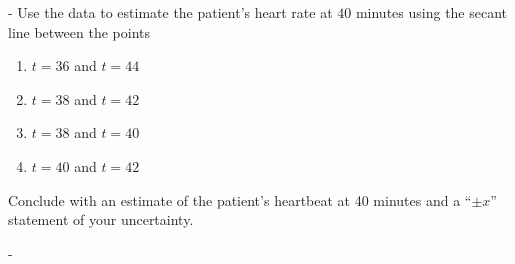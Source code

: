 \documentclass[12pt]{article}
\makeatletter
\newcounter{probcount}
\newcounter{subprobcount}
\newlength\probsep
\newlength\pshrinking
\newif\iffirstprob
\newenvironment{aproblems}%
  {\ifhmode\unskip\par\fi\setcounter{probcount}{0}\probsep\parskip
  \sbox\@tempboxa{\textbf{9.}}\pshrinking\wd\@tempboxa\advance\pshrinking\labelsep
  \let\hproblem\aproblem
  \advance\linewidth -\pshrinking
  \advance\@totalleftmargin\pshrinking
  \advance\leftskip\pshrinking}%
  {\ifhmode\unskip \par\fi\advance\leftskip-\pshrinking}%
\newcommand{\aproblem}{%
  \setcounter{subprobcount}{0}%
  \stepcounter{probcount}%
  \def\@currentlabel{\arabic{probcount}}%
  \ifhmode
    \unskip \par
  \fi
  \iffirstprob\else\addvspace\probsep\fi
  \firstprobfalse
  \hskip -\labelwidth\hskip -\labelsep 
  \hbox to\labelwidth{\hss\textbf{\arabic{probcount}.}}\hskip\labelsep
}%
\makeatother
\begin{document}
\begin{aproblems}
Use the data to estimate the patient's heart rate at $40$ minutes using the secant line between the points
\renewcommand{\labelenumi}{\alph{enumi})}
\begin{enumerate}
\item $t=36$ and $t=44$
\item $t=38$ and $t=42$
\item $t=38$ and $t=40$
\item $t=40$ and $t=42$
\end{enumerate}
Conclude with an estimate of the patient's heartbeat at 40 minutes and a ``$\pm x$'' statement of your uncertainty.
\vfill


\end{aproblems}
\end{document}
